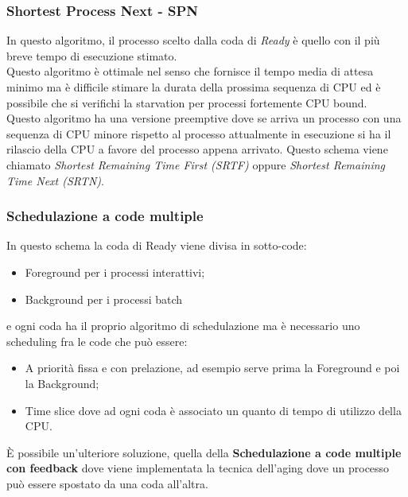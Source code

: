 \documentclass[12pt, letterpaper]{report}
\begin{document}
	\subsubsection{Shortest Process Next - SPN}
	In questo algoritmo, il processo scelto dalla coda di \textit{Ready} è quello con il più breve tempo di esecuzione stimato. \\
	Questo algoritmo è ottimale nel senso che fornisce il tempo media di attesa minimo ma è difficile stimare la durata della prossima sequenza di CPU ed è possibile che si verifichi la starvation per processi fortemente CPU bound. \\
	Questo algoritmo ha una versione preemptive dove se arriva un processo con una sequenza di CPU minore rispetto al processo attualmente in esecuzione si ha il rilascio della CPU a favore del processo appena arrivato. Questo schema viene chiamato \textit{Shortest Remaining Time First (SRTF)} oppure \textit{Shortest Remaining Time Next (SRTN)}.
	\subsubsection{Schedulazione a code multiple}
	In questo schema la coda di Ready viene divisa in sotto-code:
	\begin{itemize}
		\item Foreground per i processi interattivi;
		\item Background per i processi batch
	\end{itemize}
	e ogni coda ha il proprio algoritmo di schedulazione ma è necessario uno scheduling fra le code che può essere:
	\begin{itemize}
		\item A priorità fissa e con prelazione, ad esempio serve prima la Foreground e poi la Background;
		\item Time slice dove ad ogni coda è associato un quanto di tempo di utilizzo della CPU.
	\end{itemize}
	È possibile un'ulteriore soluzione, quella della \textbf{Schedulazione a code multiple con feedback} dove viene implementata la tecnica dell'aging dove un processo può essere spostato da una coda all'altra.
\end{document}
